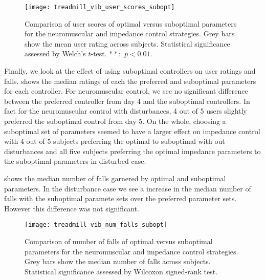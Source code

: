 \begin{figure}[b]
    \centering 
    \texttt{[image: treadmill\_vib\_user\_scores\_subopt]}
    \caption{Comparison of user scores of optimal versus suboptimal parameters
    for the neuromuscular and impedance control strategies. Grey bars show the
    mean user rating across subjects. Statistical significance assessed by
    Welch's $t$-test. $**$:~$p <
    0.01$.}\label{fig:treadmill_exp_user_ratings_subopt}
\end{figure}
Finally, we look at the effect of using suboptimal controllers on user ratings
and falls.  shows the median ratings of
each the preferred and suboptimal parameters for each controller. For
neuromuscular control, we see no significant difference between the preferred
controller from day 4 and the suboptimal controllers. In fact for the
neuromuscular control with disturbances, 4 out of 5 users slightly preferred the
suboptimal control from day 5. On the whole, choosing a suboptimal set of
parameters seemed to have a larger effect on impedance control with 4 out of 5
subjects preferring the optimal to suboptimal with out disturbances and all five
subjects preferring the optimal impedance parameters to the suboptimal
parameters in disturbed case.

 shows the median number of falls
garnered by optimal and suboptimal parameters. In the disturbance case we see a
increase in the median number of falls with the suboptimal paramete sets over
the preferred parameter sets. However this difference was not significant.

\begin{figure}[t]
    \centering 
    \texttt{[image: treadmill\_vib\_num\_falls\_subopt]}
    \caption{Comparison of number of falls of optimal versus suboptimal
    parameters for the neuromuscular and impedance control strategies. Grey bars
    show the median number of falls across subjects. Statistical significance
    assessed by Wilcoxon signed-rank
    test.}\label{fig:treadmill_exp_num_falls_subopt}
\end{figure}
